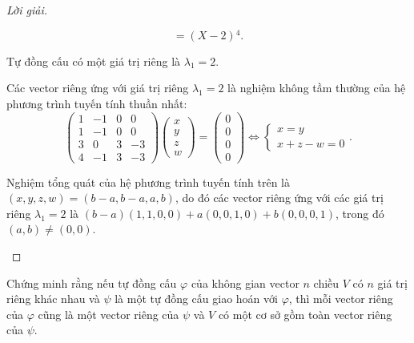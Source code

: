 \documentclass[class=linearalgebra,crop=false]{standalone}
\begin{document}
\begin{proof}[Lời giải]
\begin{enumerate}[label = (\alph*)]
\[                  = (X - 2){}^{4}.
              \]
              \par Tự đồng cấu có một giá trị riêng là $\lambda_{1} = 2$.
              \par Các vector riêng ứng với giá trị riêng $\lambda_{1} = 2$ là nghiệm không tầm thường của hệ phương trình tuyến tính thuần nhất:
              \[
                  \begin{pmatrix}
                      1 & -1 & 0 & 0  \\
                      1 & -1 & 0 & 0  \\
                      3 & 0  & 3 & -3 \\
                      4 & -1 & 3 & -3
                  \end{pmatrix}
                  \begin{pmatrix}
                      x \\
                      y \\
                      z \\
                      w
                  \end{pmatrix}
                  =
                  \begin{pmatrix}
                      0 \\
                      0 \\
                      0 \\
                      0
                  \end{pmatrix}
                  \Longleftrightarrow
                  \begin{cases}
                      x = y \\
                      x + z - w = 0
                  \end{cases}.
              \]
              \par Nghiệm tổng quát của hệ phương trình tuyến tính trên là $(x, y, z, w) = (b-a, b-a, a, b)$, do đó các vector riêng ứng với các giá trị riêng $\lambda_{1} = 2$ là $(b-a)(1, 1, 0, 0) + a(0, 0, 1, 0) + b(0, 0, 0, 1)$, trong đó $(a, b)\ne (0, 0)$.
    \end{enumerate}
\end{proof}

\begin{exercise}
    \par Chứng minh rằng nếu tự đồng cấu $\varphi$ của không gian vector $n$ chiều $V$ có $n$ giá trị riêng khác nhau và $\psi$ là một tự đồng cấu giao hoán với $\varphi$, thì mỗi vector riêng của $\varphi$ cũng là một vector riêng của $\psi$ và $V$ có một cơ sở gồm toàn vector riêng của $\psi$.
\end{exercise}
\end{document}
